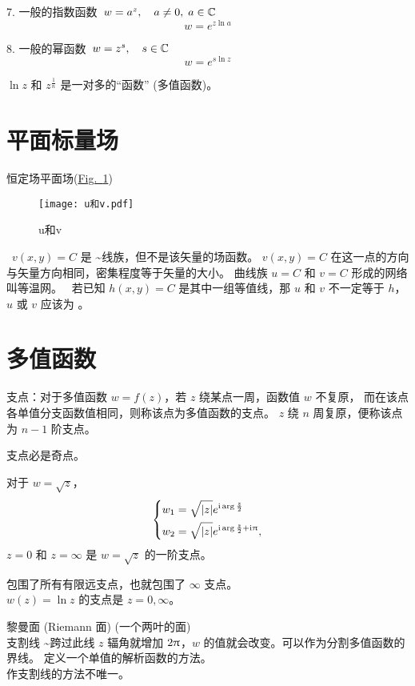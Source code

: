 \documentclass[12pt, a4paper, oneside, UTF8]{ctexbook}
\begin{document}
7. 一般的指数函数\quad\  $w=a^z,\quad a\neq 0,\;a\in\mathbb{C}$
\[w=e^{z\ln a}\]

8. 一般的幂函数\quad\  $w=z^s,\quad s\in\mathbb{C}$
\[w=e^{s\ln z}\]

 $\ln z$ 和 $z^{\frac{1}{n}}$ 是一对多的“函数” (多值函数)。
\section{平面标量场}

恒定场\quad 平面场\quad (\hyperref[fig:u和v]{Fig.~\ref{fig:u和v}})
\begin{figure}
    \centering
    \texttt{[image: u和v.pdf]}
    \caption{\label{fig:u和v} u和v}
\end{figure}
\begin{rmk}{}
    ~$v(x,y)=C$ 是 \textasciitilde 线族，但不是该矢量的场函数。
    $v(x,y)=C$ 在这一点的方向与矢量方向相同，密集程度等于矢量的大小。
    曲线族 $u=C$ 和 $v=C$ 形成的网络叫等温网。
    ~若已知 $h(x,y)=C$ 是其中一组等值线，那 $u$ 和 $v$ 不一定等于 $h$，
    $u$ 或 $v$ 应该为 。
\end{rmk}

\section{多值函数}

\noindent 支点：对于多值函数 $w=f(z)$，若 $z$ 绕某点一周，函数值 $w$ 不复原，
而在该点各单值分支函数值相同，则称该点为多值函数的支点。
$z$ 绕 $n$ 周复原，便称该点为 $n-1$ 阶支点。

 支点必是奇点。

\begin{example}{}
    对于 $w=\sqrt{z}$，
    \begin{equation*}
        \left\{ 
        \begin{lgathered} 
            w_1=\sqrt{\left\lvert z\right\rvert }e^{\mi \arg \frac{z}{2}}\\
            w_2=\sqrt{\left\lvert z\right\rvert }e^{\mi \arg \frac{z}{2}+\mi \mpi},
        \end{lgathered}   
        \right.
    \end{equation*}
    $z=0$ 和 $z=\infty$ 是 $w=\sqrt{z}$ 的一阶支点。
\end{example}
 包围了所有有限远支点，也就包围了 $\infty$ 支点。\\
$w(z)=\ln{z}$ 的支点是 $z=0,\infty$。

黎曼面 (Riemann 面) (一个两叶的面)\\
支割线 \textasciitilde 跨过此线 $z$ 辐角就增加 $2\uppi$，$w$ 的值就会改变。可以作为分割多值函数的界线。
定义一个单值的解析函数的方法。\\
 作支割线的方法不唯一。
\end{document}
